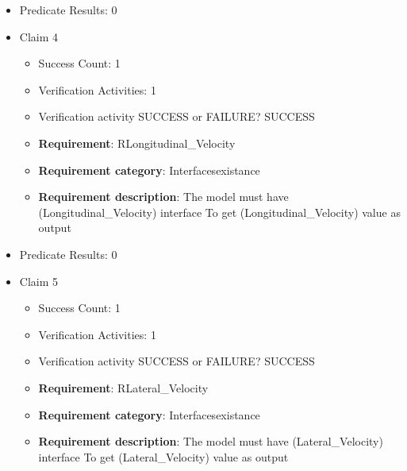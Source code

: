 \documentclass{article}
\begin{document}
\begin{itemize}
\begin{itemize}
						\item \textbf{Requirement}: RWheelsElevation 
						\item \textbf{Requirement category}: Interfacesexistance 
						\item \textbf{Requirement description}: The model must have (WheelsElevation) interface To get (WheelsElevation) value as input
					
				\end{itemize}
				
									    
				\item Predicate Results: 0

  				  \item Claim 4
				\begin{itemize}
			    	\item Success Count: 1 
			    	\item Verification Activities: 1
					\item Verification activity SUCCESS or FAILURE? SUCCESS
		
						\item \textbf{Requirement}: RLongitudinal\_Velocity 
						\item \textbf{Requirement category}: Interfacesexistance 
						\item \textbf{Requirement description}: The model must have (Longitudinal\_Velocity) interface To get (Longitudinal\_Velocity) value as output
					
				\end{itemize}
				
									    
				\item Predicate Results: 0

  				  \item Claim 5
				\begin{itemize}
			    	\item Success Count: 1 
			    	\item Verification Activities: 1
					\item Verification activity SUCCESS or FAILURE? SUCCESS
		
						\item \textbf{Requirement}: RLateral\_Velocity 
						\item \textbf{Requirement category}: Interfacesexistance 
						\item \textbf{Requirement description}: The model must have (Lateral\_Velocity) interface To get (Lateral\_Velocity) value as output
					
				\end{itemize}
				

\end{itemize}
\end{document}
